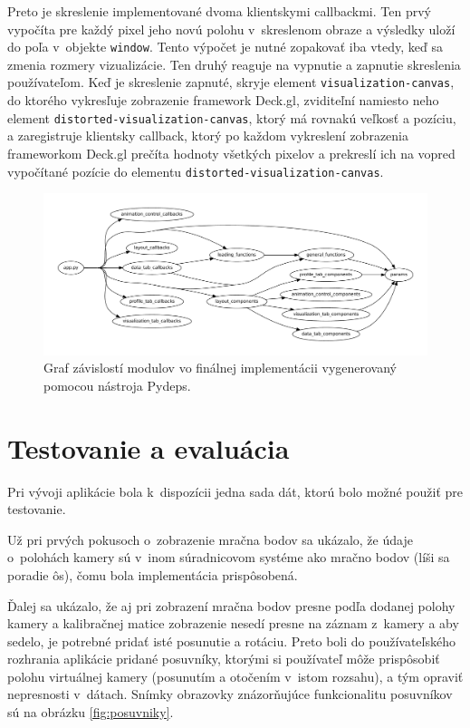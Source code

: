 Preto je skreslenie implementované dvoma klientskymi callbackmi. Ten prvý vypočíta pre každý pixel jeho novú polohu v~skreslenom obraze a výsledky uloží do poľa v~objekte \texttt{window}. Tento výpočet je nutné zopakovať iba vtedy, keď sa zmenia rozmery vizualizácie. Ten druhý reaguje na vypnutie a zapnutie skreslenia používateľom. Keď je skreslenie zapnuté, skryje element \texttt{visualization-canvas}, do ktorého vykresľuje zobrazenie framework Deck.gl, zviditeľní namiesto neho element \texttt{distorted-visualization-canvas}, ktorý má rovnakú veľkosť a pozíciu, a zaregistruje klientsky callback, ktorý po každom vykreslení zobrazenia frameworkom Deck.gl prečíta hodnoty všetkých pixelov a prekreslí ich na vopred vypočítané pozície do elementu \texttt{distorted-visualization-canvas}.

\begin{figure}
    \centering
    \includegraphics[width=1\linewidth]{text_prace/obrazky-figures/graf_modulov.pdf}
    \caption[Graf závislostí modulov vo finálnej implementácii.]{Graf závislostí modulov vo finálnej implementácii vygenerovaný pomocou nástroja Pydeps.}
    \label{fig:graf_zavislosti}
\end{figure}

\chapter{Testovanie a evaluácia}
\label{ch:vyhodnotenie}

Pri vývoji aplikácie bola k~dispozícii jedna sada dát, ktorú bolo možné použiť pre testovanie.

Už pri prvých pokusoch o~zobrazenie mračna bodov sa ukázalo, že údaje o~polohách kamery sú v~inom súradnicovom systéme ako mračno bodov (líši sa poradie ôs), čomu bola implementácia prispôsobená.

Ďalej sa ukázalo, že aj pri zobrazení mračna bodov presne podľa dodanej polohy kamery a kalibračnej matice zobrazenie nesedí presne na záznam z~kamery a aby sedelo, je potrebné pridať isté posunutie a rotáciu. Preto boli do používateľského rozhrania aplikácie pridané posuvníky, ktorými si používateľ môže prispôsobiť polohu virtuálnej kamery (posunutím a otočením v~istom rozsahu), a tým opraviť nepresnosti v~dátach. Snímky obrazovky znázorňujúce funkcionalitu posuvníkov sú na obrázku \ref{fig:posuvniky}.

